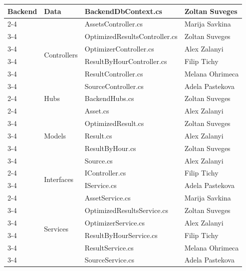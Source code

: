 \begin{longtable}{|p{1.5cm}|p{2cm}|p{5.4cm}|p{4.5cm}|}
\multirow{21}{*}{Backend} & Data & BackendDbContext.cs & Zoltan Suveges\\
\cline{2-4}
&\multirow{6}{*}{Controllers} & AssetsController.cs & Marija Savkina\\
\cline{3-4}
& & OptimizedResultsController.cs & Zoltan Suveges\\
\cline{3-4}
& & OptimizerController.cs & Alex Zalanyi\\
\cline{3-4}
& & ResultByHourController.cs & Filip Tichy\\
\cline{3-4}
& & ResultController.cs & Melana Ohrimeca\\
\cline{3-4}
& & SourceController.cs & Adela Pastekova\\
\cline{2-4}
& Hubs & BackendHubs.cs & Zoltan Suveges\\
\cline{2-4}
&\multirow{5}{*}{Models} & Asset.cs & Alex Zalanyi\\
\cline{3-4}
& & OptimizedResult.cs & Zoltan Suveges\\
\cline{3-4}
& & Result.cs & Alex Zalanyi\\
\cline{3-4}
& & ResultByHour.cs & Zoltan Suveges\\
\cline{3-4}
& & Source.cs & Alex Zalanyi\\
\cline{2-4}
&\multirow{2}{*}{Interfaces} & IController.cs & Filip Tichy\\
\cline{3-4}
& & IService.cs & Adela Pastekova\\
\cline{2-4}
&\multirow{6}{*}{Services} & AssetService.cs & Marija Savkina\\
\cline{3-4}
& & OptimizedResultsService.cs & Zoltan Suveges\\
\cline{3-4}
& & OptimizerService.cs & Alex Zalanyi\\
\cline{3-4}
& & ResultByHourService.cs & Filip Tichy\\
\cline{3-4}
& & ResultService.cs & Melana Ohrimeca\\
\cline{3-4}
& & SourceService.cs & Adela Pastekova\\
\hline 


\end{longtable}
